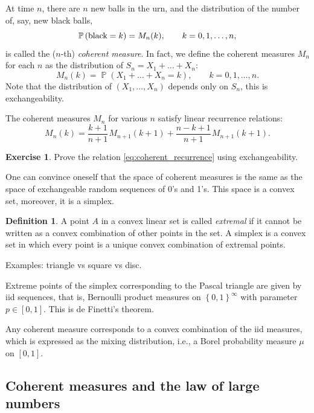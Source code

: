 \documentclass[letterpaper,11pt,oneside,reqno]{article}
\numberwithin{equation}{section}
\newcommand{\ssp}{\hspace{1pt}}
\theoremstyle{definition}
\newtheorem{definition}[proposition]{Definition}
\newtheorem{exercise}[proposition]{Exercise}
\begin{document}
At time $n$, there are $n$ new balls in the urn, and the distribution of the number of, say,
new black balls,
\begin{equation*}
	\operatorname{\mathbb{P}}\left( \textnormal{black}=k \right) = M_n(k),
	\qquad k=0,1,\ldots,n,
\end{equation*}
is called the ($n$-th) \emph{coherent measure}.
In fact, we define the coherent measures
$M_n$ for each $n$ as the distribution of
$S_n=X_1+\ldots+X_n $:
\begin{equation*}
	M_n(k)=\operatorname{\mathbb{P}}\left( 
	X_1+\ldots+X_n=k\right),\qquad k=0,1,\ldots,n.
\end{equation*}
Note that the distribution of 
$(X_1,\ldots,X_n )$ depends only on 
$S_n$, this is exchangeability.

The coherent measures $M_n$ for various $n$ satisfy linear
recurrence relations:
\begin{equation}
	\label{eq:coherent_recurrence}
	M_n(k)=
	\frac{k+1}{n+1}\ssp M_{n+1}(k+1)
	+
	\frac{n-k+1}{n+1}\ssp M_{n+1}(k+1).
\end{equation}
\begin{exercise}
	Prove the relation \eqref{eq:coherent_recurrence}
	using exchangeability.
\end{exercise}

One can convince oneself that the space of coherent measures is
the same as the space of exchangeable random sequences of 0's and 1's.
This space is a convex set, moreover, it is a simplex.

\begin{definition}
	A point $A$ in a convex linear set is called
	\emph{extremal} if it cannot be written as a convex combination of other points in the set.
	A simplex is a convex set in which every point is a unique
	convex combination of extremal points.

	Examples: triangle vs square vs disc.
\end{definition}

Extreme points of the simplex corresponding to the Pascal triangle
are given by iid sequences,
that is, Bernoulli product measures on $\left\{ 0,1 \right\}^\infty$ with
parameter $p\in[0,1]$.
This is de Finetti's theorem.

Any coherent measure corresponds to a convex combination of the iid measures,
which is expressed as the mixing distribution, i.e., a Borel
probability measure $\mu$ on $[0,1]$.

\subsection{Coherent measures and the law of large numbers}
\end{document}
